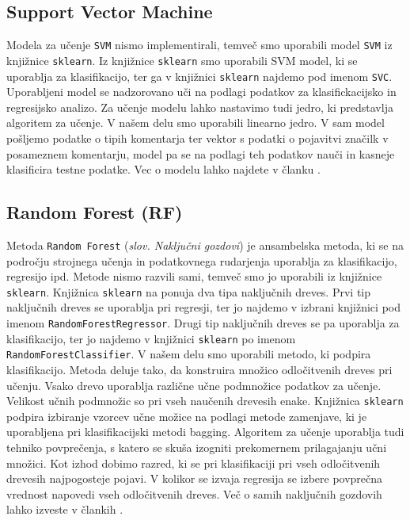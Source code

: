 \documentclass{acm_proc_article-sp}
\begin{document}
\subsection{Support Vector Machine}
Modela za učenje {\tt SVM}  nismo implementirali, temveč smo uporabili model {\tt SVM} iz knjižnice {\tt sklearn}.
Iz knjižnice {\tt sklearn} smo uporabili SVM model, ki se uporablja za klasifikacijo, ter ga v knjižnici {\tt sklearn} najdemo pod imenom {\tt SVC}.
Uporabljeni model se nadzorovano uči na podlagi podatkov za klasifickacijsko in regresijsko analizo.
Za učenje modelu lahko nastavimo tudi jedro, ki predstavlja algoritem za učenje.
V našem delu smo uporabili linearno jedro.
V sam model pošljemo podatke o tipih komentarja ter vektor s podatki o pojavitvi značilk v posameznem komentarju, model pa se na podlagi teh podatkov nauči in kasneje klasificira testne podatke.
Vec o modelu lahko najdete v članku \cite{Cortes1995}.

\subsection{Random Forest (RF)}
Metoda {\tt Random Forest} ({\it slov. Naključni gozdovi}) je ansambelska metoda, ki se na področju strojnega učenja in podatkovnega rudarjenja uporablja za klasifikacijo, regresijo ipd.
Metode nismo razvili sami, temveč smo jo uporabili iz knjižnice {\tt sklearn}.
Knjižnica {\tt sklearn} na ponuja dva tipa naključnih dreves.
Prvi tip naključnih dreves se uporablja pri regresji, ter jo najdemo v izbrani knjižnici pod imenom {\tt RandomForestRegressor}.
Drugi tip naključnih dreves se pa uporablja za klasifikacijo, ter jo najdemo v knjižnici {\tt sklearn} po imenom {\tt RandomForestClassifier}.
V našem delu smo uporabili metodo, ki podpira klasifikacijo.
Metoda deluje tako, da konstruira množico odločitvenih dreves pri učenju.
Vsako drevo uporablja različne učne podmnožice podatkov za učenje. Velikost učnih podmnožic so pri vseh naučenih drevesih enake.
Knjižnica {\tt sklearn} podpira izbiranje vzorcev učne možice na podlagi metode zamenjave, ki je uporabljena pri klasifikacijski metodi bagging.
Algoritem za učenje uporablja tudi tehniko povprečenja, s katero se skuša izogniti prekomernem prilagajanju učni množici.
Kot izhod dobimo razred, ki se pri klasifikaciji pri vseh odločitvenih drevesih najpogosteje pojavi.
V kolikor se izvaja regresija se izbere povprečna vrednost napovedi vseh odločitvenih dreves.
Več o samih naključnih gozdovih lahko izveste v člankih \cite{ho1998random, ho1995random}.
\end{document}
